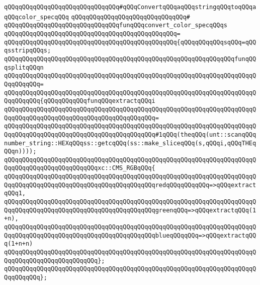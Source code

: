 \newline
\verb|qQQqqQQqqQQqqQQqqQQqqQQqqQQqqQQq#qQQqConvertqQQqaqQQqstringqQQqtoqQQqaqQQqcolor_specqQQq|\newline
\verb|qQQqqQQqqQQqqQQqqQQqqQQqqQQqqQQq#|\newline
\verb|qQQqqQQqqQQqqQQqqQQqqQQqqQQqqQQqfunqQQqconvert_color_specqQQqs|\newline
\verb|qQQqqQQqqQQqqQQqqQQqqQQqqQQqqQQqqQQqqQQqqQQqqQQq=|\newline
\verb|qQQqqQQqqQQqqQQqqQQqqQQqqQQqqQQqqQQqqQQqqQQqqQQq{qQQqqQQqqQQqsqQQq=qQQqsstripqQQqs;|\newline
\newline
\verb|qQQqqQQqqQQqqQQqqQQqqQQqqQQqqQQqqQQqqQQqqQQqqQQqqQQqqQQqqQQqqQQqfunqQQqsplitqQQqn|\newline
\verb|qQQqqQQqqQQqqQQqqQQqqQQqqQQqqQQqqQQqqQQqqQQqqQQqqQQqqQQqqQQqqQQqqQQqqQQqqQQqqQQq=|\newline
\verb|qQQqqQQqqQQqqQQqqQQqqQQqqQQqqQQqqQQqqQQqqQQqqQQqqQQqqQQqqQQqqQQqqQQqqQQqqQQqqQQq{qQQqqQQqqQQqfunqQQqextractqQQqi|\newline
\verb|qQQqqQQqqQQqqQQqqQQqqQQqqQQqqQQqqQQqqQQqqQQqqQQqqQQqqQQqqQQqqQQqqQQqqQQqqQQqqQQqqQQqqQQqqQQqqQQqqQQqqQQqqQQqqQQq=|\newline
\verb|qQQqqQQqqQQqqQQqqQQqqQQqqQQqqQQqqQQqqQQqqQQqqQQqqQQqqQQqqQQqqQQqqQQqqQQqqQQqqQQqqQQqqQQqqQQqqQQqqQQqqQQqqQQqqQQq#1qQQq(theqQQq(unt::scanqQQqnumber_string::HEXqQQqss::getcqQQq(ss::make_sliceqQQq(s,qQQqi,qQQqTHEqQQqn))));|\newline
\newline
\verb|qQQqqQQqqQQqqQQqqQQqqQQqqQQqqQQqqQQqqQQqqQQqqQQqqQQqqQQqqQQqqQQqqQQqqQQqqQQqqQQqqQQqqQQqqQQqqQQqxc::CMS_RGBqQQq{|\newline
\verb|qQQqqQQqqQQqqQQqqQQqqQQqqQQqqQQqqQQqqQQqqQQqqQQqqQQqqQQqqQQqqQQqqQQqqQQqqQQqqQQqqQQqqQQqqQQqqQQqqQQqqQQqqQQqqQQqredqQQqqQQqqQQq=>qQQqextractqQQq1,|\newline
\verb|qQQqqQQqqQQqqQQqqQQqqQQqqQQqqQQqqQQqqQQqqQQqqQQqqQQqqQQqqQQqqQQqqQQqqQQqqQQqqQQqqQQqqQQqqQQqqQQqqQQqqQQqqQQqqQQqgreenqQQq=>qQQqextractqQQq(1+n),|\newline
\verb|qQQqqQQqqQQqqQQqqQQqqQQqqQQqqQQqqQQqqQQqqQQqqQQqqQQqqQQqqQQqqQQqqQQqqQQqqQQqqQQqqQQqqQQqqQQqqQQqqQQqqQQqqQQqqQQqblueqQQqqQQq=>qQQqextractqQQq(1+n+n)|\newline
\verb|qQQqqQQqqQQqqQQqqQQqqQQqqQQqqQQqqQQqqQQqqQQqqQQqqQQqqQQqqQQqqQQqqQQqqQQqqQQqqQQqqQQqqQQqqQQqqQQq};|\newline
\verb|qQQqqQQqqQQqqQQqqQQqqQQqqQQqqQQqqQQqqQQqqQQqqQQqqQQqqQQqqQQqqQQqqQQqqQQqqQQqqQQq};|\newline
